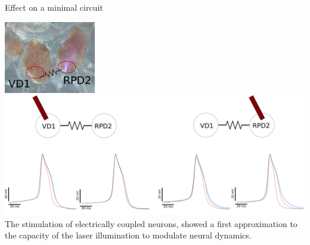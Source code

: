 \documentclass[aspectratio=43]{beamer}
\begin{document}
\begin{frame}{Effect on a minimal circuit}
	
	\includegraphics[width=0.3\textwidth]{Images/electrical_ganglia.png}
	\\
	\includegraphics[width=\textwidth]{Images/electrical_result.png}
	\\
	The stimulation of electrically coupled neurons, showed a first approximation to the capacity of the laser illumination to modulate neural dynamics. 
	
	
	
\end{frame}

%			
\end{document}
